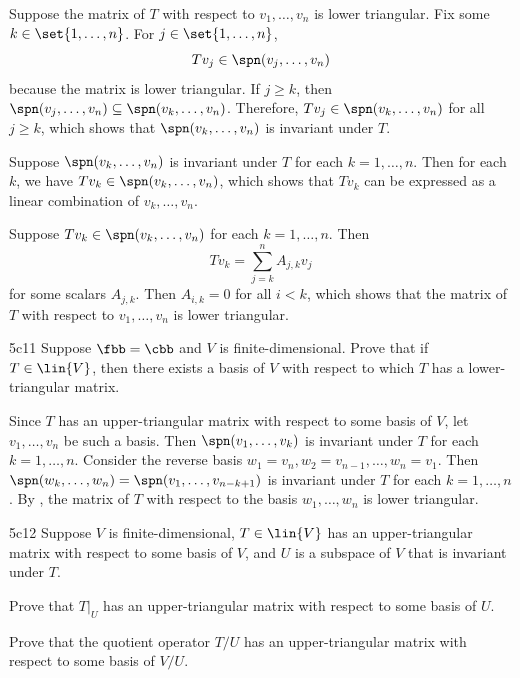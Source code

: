 \begin{solitem}
    \item Suppose the matrix of $T$ with respect to $v_1, \ldots, v_n$ is lower triangular.
    Fix some $k \in \set{1, \ldots, n}$.
    For $j \in \set{1, \ldots, n}$, 
    \[
        Tv_j \in \spn(v_j, \ldots, v_n)
    \]
    because the matrix is lower triangular.
    If $j \geq k$, then $\spn(v_j, \ldots, v_n) \subseteq \spn(v_k, \ldots, v_n)$.
    Therefore, $Tv_j \in \spn(v_k, \ldots, v_n)$ for all $j \geq k$, which shows that $\spn(v_k, \ldots, v_n)$ is invariant under $T$.
    \item Suppose $\spn(v_k, \ldots, v_n)$ is invariant under $T$ for each $k = 1, \ldots, n$.
    Then for each $k$, we have $Tv_k \in \spn(v_k, \ldots, v_n)$, which shows that $Tv_k$ can be expressed as a linear combination of $v_k, \ldots, v_n$.
    \item Suppose $Tv_k \in \spn(v_k, \ldots, v_n)$ for each $k = 1, \ldots, n$.
    Then
    \[
        Tv_k = \sum_{j = k}^n A_{j, k}v_j
    \]
    for some scalars $A_{j, k}$.
    Then $A_{i, k} = 0$ for all $i < k$, which shows that the matrix of $T$ with respect to $v_1, \ldots, v_n$ is lower triangular.
\end{solitem}

\begin{exercise}{5c11}
    Suppose $\fbb = \cbb$ and $V$ is finite-dimensional.
    Prove that if $T \in \lin{V}$, then there exists a basis of $V$ with respect to which $T$ has a lower-triangular matrix.
\end{exercise}

\begin{sol}
    Since $T$ has an upper-triangular matrix with respect to some basis of $V$, let $v_1, \ldots, v_n$ be such a basis.
    Then $\spn(v_1, \ldots, v_k)$ is invariant under $T$ for each $k = 1, \ldots, n$.
    Consider the reverse basis $w_1 = v_n, w_2 = v_{n-1}, \ldots, w_n = v_1$.
    Then $\spn(w_k, \ldots, w_n) = \spn(v_1, \ldots, v_{n-k+1})$ is invariant under $T$ for each $k = 1, \ldots, n$.
    By , the matrix of $T$ with respect to the basis $w_1, \ldots, w_n$ is lower triangular.
\end{sol}

\begin{exercise}{5c12}
    Suppose $V$ is finite-dimensional, $T \in \lin{V}$ has an upper-triangular matrix with respect to some basis of $V$, and $U$ is a subspace of $V$ that is invariant under $T$.
    \begin{subexercises}
        \item Prove that $T|_U$ has an upper-triangular matrix with respect to some basis of $U$.
        \item Prove that the quotient operator $T/U$ has an upper-triangular matrix with respect to some basis of $V/U$.
    \end{subexercises}
\end{exercise}

